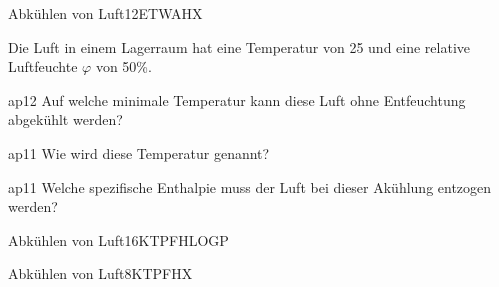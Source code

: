 \documentclass[bsz-mkk-exam,ka]{teacher}
\begin{document}

\begin{examaufgabe}[T]{Abkühlen von Luft}{12}{ET}{WA}{HX}
   \begin{textonly}
     Die Luft in einem Lagerraum hat eine Temperatur von
     \unit{25}{\celsius} und eine relative Luftfeuchte $\varphi$ von
     \unit{50}{\%}.
   \end{textonly}
   \begin{teilaufgabe}{ap}{1}{2}
     Auf welche minimale Temperatur kann diese Luft ohne Entfeuchtung
     abgekühlt werden?
   \end{teilaufgabe}
   \begin{loesung}
   \end{loesung}
   \begin{teilaufgabe}{ap}{1}{1}
      Wie wird diese Temperatur genannt?
   \end{teilaufgabe}
   \begin{loesung}
   \end{loesung}
   \begin{teilaufgabe}{ap}{1}{1}
     Welche spezifische Enthalpie muss der Luft bei dieser Akühlung
     entzogen werden?
   \end{teilaufgabe}
   \begin{loesung}
   \end{loesung}
\end{examaufgabe}

\begin{examaufgabe}[T]{Abkühlen von Luft}{16}{KT}{PF}{HLOGP}
\end{examaufgabe}

\begin{examaufgabe}[T]{Abkühlen von Luft}{8}{KT}{PF}{HX}
\end{examaufgabe}
\end{document}
